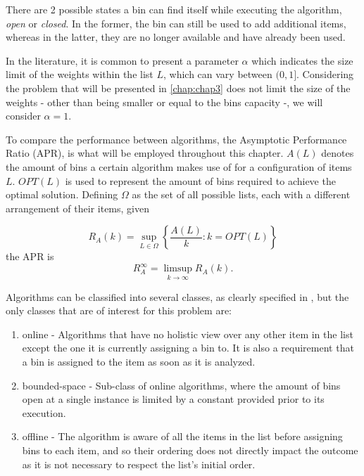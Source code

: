 There are 2 possible states a bin can find itself while executing the algorithm, \textit{open} or \textit{closed}. In the former, the bin can still be used to add additional items, whereas in the latter, they are no longer available and have already been used.

In the literature, it is common to present a parameter $\alpha$ which indicates the size limit of the weights within the list $L$, which can vary between \( (0, 1] \). Considering the problem that will be presented in \ref{chap:chap3} does not limit the size of the weights - other than being smaller or equal to the bins capacity -, we will consider $\alpha = 1$. 

To compare the performance between algorithms, the Asymptotic Performance Ratio (APR), is what will be employed throughout this chapter. $A(L)$ denotes the amount of bins a certain algorithm makes use of for a configuration of items $L$. $OPT(L)$ is used to represent the amount of bins required to achieve the optimal solution. Defining $\Omega$ as the set of all possible lists, each with a different arrangement of their items, given 

\begin{equation}
    R_A (k) = \sup_{L \in \Omega} \left \{ \frac{A(L)}{k} : k = OPT(L) \right \}
\end{equation}
the APR is
\begin{equation}
    R_A^\infty = \limsup_{k \to \infty} R_A(k).
\end{equation}

Algorithms can be classified into several classes, as clearly specified in \cite{coffman2013bin}, but the only classes that are of interest for this problem are:
\begin{enumerate}
    \item online - Algorithms that have no holistic view over any other item in the list except the one it is currently assigning a bin to. It is also a requirement that a bin is assigned to the item as soon as it is analyzed.
    \item bounded-space - Sub-class of online algorithms, where the amount of bins open at a single instance is limited by a constant provided prior to its execution.
    \item offline - The algorithm is aware of all the items in the list before assigning bins to each item, and so their ordering does not directly impact the outcome as it is not necessary to respect the list's initial order.
\end{enumerate}

